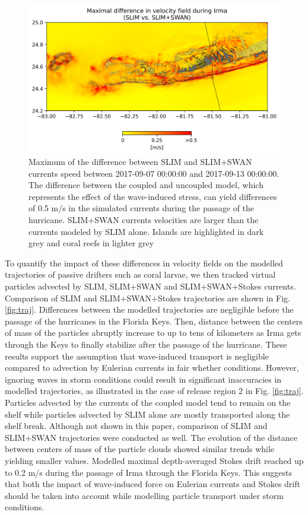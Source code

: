 \documentclass[11pt,a4paper]{article}
\begin{document}
\begin{figure}
    \centering
    \includegraphics[width=.95\textwidth]{fig/max_diff_reefs.png}
    \caption{Maximum of the difference between SLIM and SLIM+SWAN currents speed between 2017-09-07 00:00:00 and 2017-09-13 00:00:00. The difference between the coupled and uncoupled model, which represents the effect of the wave-induced stress, can yield differences of 0.5 m/s in the simulated currents during the passage of the hurricane. SLIM+SWAN currents velocities are larger than the currents modeled by SLIM alone. Islands are highlighted in dark grey and coral reefs in lighter grey}
    \label{fig:diff}
\end{figure}

To quantify the impact of these differences in velocity fields on the modelled trajectories of passive drifters such as coral larvae, we then tracked virtual particles advected by SLIM, SLIM+SWAN and SLIM+SWAN+Stokes currents. Comparison of SLIM and SLIM+SWAN+Stokes trajectories are shown in Fig. \ref{fig:traj}. Differences between the modelled trajectories are negligible before the passage of the hurricanes in the Florida Keys. Then, distance between the centers of mass of the particles abruptly increase to up to tens of kilometers as Irma gets through the Keys to finally stabilize after the passage of the hurricane. These results support the assumption that wave-induced transport is negligible compared to advection by Eulerian currents in fair whether conditions. However, ignoring waves in storm conditions could result in significant inaccuracies in modelled trajectories, as illustrated in the case of release region 2 in Fig. \ref{fig:traj}. Particles advected by the currents of the coupled model tend to remain on the shelf while particles advected by SLIM alone are mostly transported along the shelf break. Although not shown in this paper, comparison of SLIM and SLIM+SWAN trajectories were conducted as well. The evolution of the distance between centers of mass of the particle clouds showed similar trends while yielding smaller values. Modelled maximal depth-averaged Stokes drift reached up to 0.2 m/s during the passage of Irma through the Florida Keys. This suggests that both the impact of wave-induced force on Eulerian currents and Stokes drift should be taken into account while modelling particle transport under storm conditions. 
\end{document}
